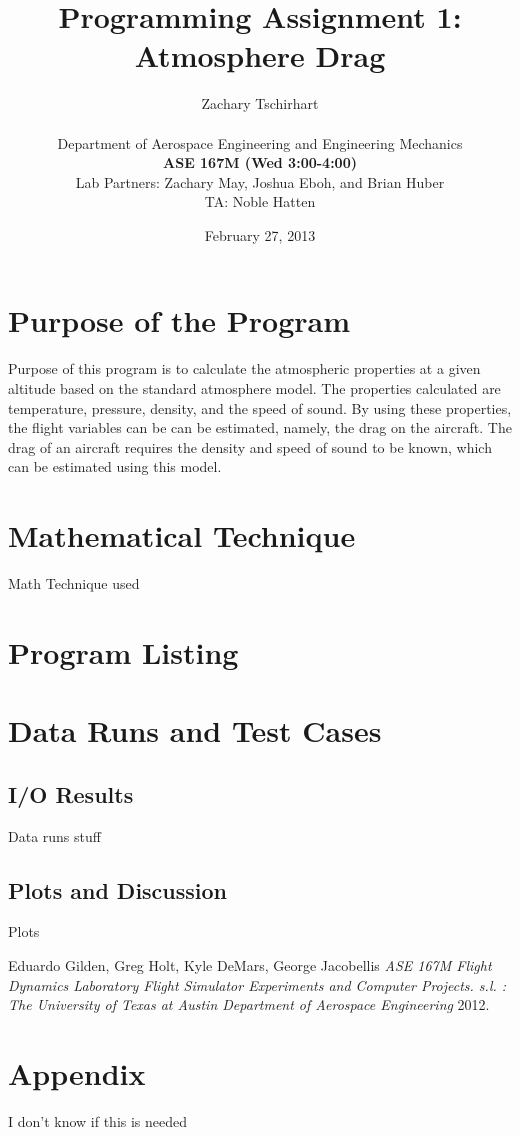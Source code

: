 \documentclass[12pt]{report}
\title{Programming Assignment 1: Atmosphere Drag}
\author{Zachary Tschirhart \\
	\small \\
	\small Department of Aerospace Engineering and Engineering Mechanics \\
	\small \textbf{ASE 167M (Wed 3:00-4:00)} \\
	\small Lab Partners: Zachary May, Joshua Eboh, and Brian Huber \\
	\small
	\small TA: Noble Hatten}
\date{February 27, 2013}
\begin{document}
\maketitle


\tableofcontents
\pagebreak

\setcounter{secnumdepth}{0}





\section{Purpose of the Program}
\doublespacing
Purpose of this program is to calculate the atmospheric properties at a given altitude based on the standard atmosphere model. The properties calculated are temperature, pressure, density, and the speed of sound. By using these properties, the flight variables can be can be estimated, namely, the drag on the aircraft. The drag of an aircraft requires the density and speed of sound to be known, which can be estimated using this model.





\section{Mathematical Technique}
\doublespacing
Math Technique used





\section{Program Listing}







\section{Data Runs and Test Cases}
\doublespacing

\subsection{I/O Results}
Data runs stuff

\subsection{Plots and Discussion}
Plots


\begin{thebibliography}{0}
 Eduardo Gilden, Greg Holt, Kyle DeMars, George Jacobellis {\em ASE 167M Flight Dynamics Laboratory Flight Simulator Experiments and Computer Projects. s.l. : The University of Texas at Austin Department of Aerospace Engineering}  2012.
\end{thebibliography}





\section{Appendix}
I don't know if this is needed
\end{document}
